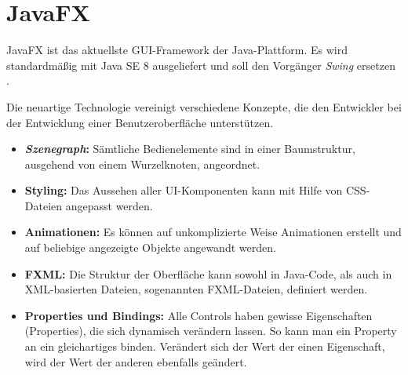 \section{JavaFX} \label{sec:javaFX}
JavaFX ist das aktuellste GUI-Framework der Java-Plattform. Es wird standardmäßig mit Java SE 8 ausgeliefert und soll den Vorgänger \textit{Swing} ersetzen \cite{Mueller2015}.\par
Die neuartige Technologie vereinigt verschiedene Konzepte, die den Entwickler bei der Entwicklung einer Benutzeroberfläche unterstützen.
\begin{itemize}
	\item \textbf{\textit{Szenegraph}:} Sämtliche Bedienelemente sind in einer Baumstruktur, ausgehend von einem Wurzelknoten, angeordnet.
	\item \textbf{Styling:} Das Aussehen aller UI-Komponenten kann mit Hilfe von CSS-Dateien angepasst werden.
	\item \textbf{Animationen:} Es können auf unkomplizierte Weise Animationen erstellt und auf beliebige angezeigte Objekte angewandt werden.
	\item \textbf{FXML:} Die Struktur der Oberfläche kann sowohl in Java-Code, als auch in XML-basierten Dateien, sogenannten FXML-Dateien, definiert werden.
	\item \textbf{Properties und Bindings:} Alle Controls haben gewisse Eigenschaften (Properties), die sich dynamisch verändern lassen. So kann man ein Property an ein gleichartiges binden. Verändert sich der Wert der einen Eigenschaft, wird der Wert der anderen ebenfalls geändert.
\end{itemize}
